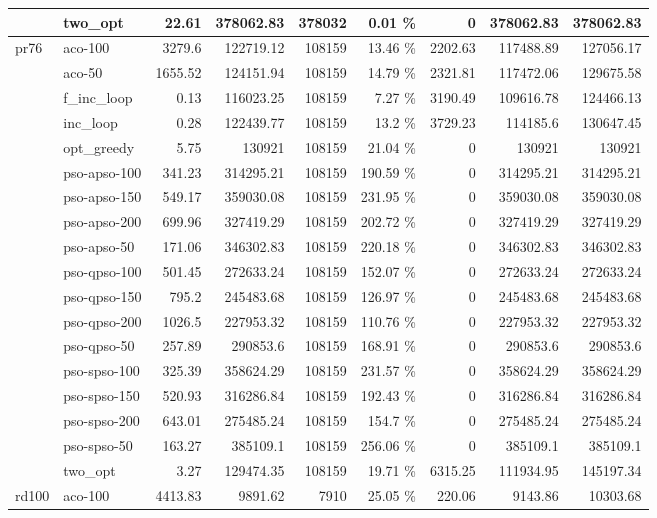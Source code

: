 \documentclass[conference]{IEEEtran}
\begin{document}
\begin{center}
\begin{longtable}[ht]{|l|l|r|r|r|r|r|r|r|}
 & two\_opt & 22.61 & 378062.83 & 378032 & 0.01 \% & 0 & 378062.83 & 378062.83 \\ \hline
pr76 & aco-100 & 3279.6 & 122719.12 & 108159 & 13.46 \% & 2202.63 & 117488.89 & 127056.17 \\ \hline
 & aco-50 & 1655.52 & 124151.94 & 108159 & 14.79 \% & 2321.81 & 117472.06 & 129675.58 \\ \hline
 & f\_inc\_loop & 0.13 & 116023.25 & 108159 & 7.27 \% & 3190.49 & 109616.78 & 124466.13 \\ \hline
 & inc\_loop & 0.28 & 122439.77 & 108159 & 13.2 \% & 3729.23 & 114185.6 & 130647.45 \\ \hline
 & opt\_greedy & 5.75 & 130921 & 108159 & 21.04 \% & 0 & 130921 & 130921 \\ \hline
 & pso-apso-100 & 341.23 & 314295.21 & 108159 & 190.59 \% & 0 & 314295.21 & 314295.21 \\ \hline
 & pso-apso-150 & 549.17 & 359030.08 & 108159 & 231.95 \% & 0 & 359030.08 & 359030.08 \\ \hline
 & pso-apso-200 & 699.96 & 327419.29 & 108159 & 202.72 \% & 0 & 327419.29 & 327419.29 \\ \hline
 & pso-apso-50 & 171.06 & 346302.83 & 108159 & 220.18 \% & 0 & 346302.83 & 346302.83 \\ \hline
 & pso-qpso-100 & 501.45 & 272633.24 & 108159 & 152.07 \% & 0 & 272633.24 & 272633.24 \\ \hline
 & pso-qpso-150 & 795.2 & 245483.68 & 108159 & 126.97 \% & 0 & 245483.68 & 245483.68 \\ \hline
 & pso-qpso-200 & 1026.5 & 227953.32 & 108159 & 110.76 \% & 0 & 227953.32 & 227953.32 \\ \hline
 & pso-qpso-50 & 257.89 & 290853.6 & 108159 & 168.91 \% & 0 & 290853.6 & 290853.6 \\ \hline
 & pso-spso-100 & 325.39 & 358624.29 & 108159 & 231.57 \% & 0 & 358624.29 & 358624.29 \\ \hline
 & pso-spso-150 & 520.93 & 316286.84 & 108159 & 192.43 \% & 0 & 316286.84 & 316286.84 \\ \hline
 & pso-spso-200 & 643.01 & 275485.24 & 108159 & 154.7 \% & 0 & 275485.24 & 275485.24 \\ \hline
 & pso-spso-50 & 163.27 & 385109.1 & 108159 & 256.06 \% & 0 & 385109.1 & 385109.1 \\ \hline
 & two\_opt & 3.27 & 129474.35 & 108159 & 19.71 \% & 6315.25 & 111934.95 & 145197.34 \\ \hline
rd100 & aco-100 & 4413.83 & 9891.62 & 7910 & 25.05 \% & 220.06 & 9143.86 & 10303.68 \\ \hline

\end{longtable}
\end{center}
\end{document}

